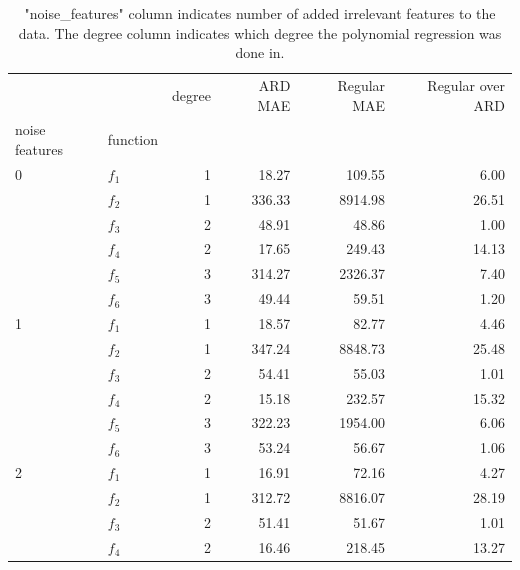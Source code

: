 \documentclass[12pt]{article}
\begin{document}
        \begin{table}[H]
            \centering
            \caption{"noise\_features" column indicates number of added irrelevant features to the data. The degree column indicates which degree the polynomial regression was done in.}
            \begin{tabular}{llrrrr}
                \toprule
                  &       &  degree &  ARD MAE &  Regular MAE &  Regular over ARD \\
                noise features & function &         &          &              &                   \\
                \midrule
                0 & $f_1$ &       1 &    18.27 &       109.55 &              6.00 \\
                & $f_2$ &       1 &   336.33 &      8914.98 &             26.51 \\
                & $f_3$ &       2 &    48.91 &        48.86 &              1.00 \\
                & $f_4$ &       2 &    17.65 &       249.43 &             14.13 \\
                & $f_5$ &       3 &   314.27 &      2326.37 &              7.40 \\
                & $f_6$ &       3 &    49.44 &        59.51 &              1.20 \\
                \midrule
                1 & $f_1$ &       1 &    18.57 &        82.77 &              4.46 \\
                & $f_2$ &       1 &   347.24 &      8848.73 &             25.48 \\
                & $f_3$ &       2 &    54.41 &        55.03 &              1.01 \\
                & $f_4$ &       2 &    15.18 &       232.57 &             15.32 \\
                & $f_5$ &       3 &   322.23 &      1954.00 &              6.06 \\
                & $f_6$ &       3 &    53.24 &        56.67 &              1.06 \\
                \midrule
                2 & $f_1$ &       1 &    16.91 &        72.16 &              4.27 \\
                & $f_2$ &       1 &   312.72 &      8816.07 &             28.19 \\
                & $f_3$ &       2 &    51.41 &        51.67 &              1.01 \\
                & $f_4$ &       2 &    16.46 &       218.45 &             13.27 \\

\end{tabular}
\end{table}
\end{document}
